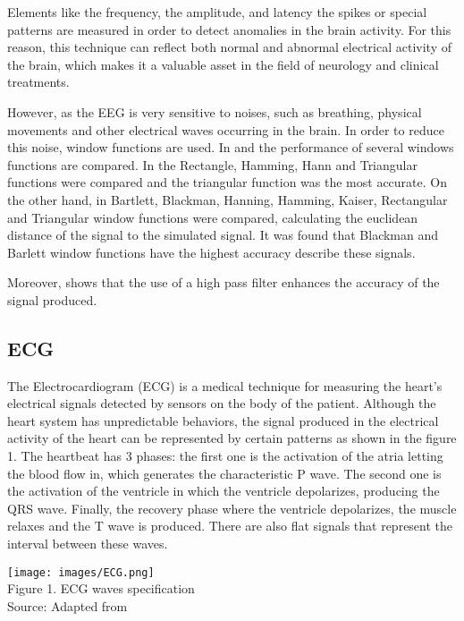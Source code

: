 Elements like the frequency, the amplitude, and latency the spikes or special patterns  are measured  in order to detect anomalies in the brain activity. For this reason, this technique can reflect both normal and abnormal electrical activity of the brain, which makes it a valuable asset in the field of neurology and clinical treatments. 

However, as the EEG is very sensitive to noises, such as breathing, physical movements and other electrical waves occurring in the brain. In order to reduce this noise, window functions are used. In \cite{EEGwindowfunc1} and \cite{EEGwindowfunc3} the performance of several windows functions are compared. In \cite{EEGwindowfunc1} the Rectangle, Hamming, Hann and Triangular functions were compared and the triangular function was the most accurate. On the other hand, in \cite{EEGwindowfunc2} Bartlett, Blackman, Hanning, Hamming, Kaiser, Rectangular and Triangular window functions were compared, calculating the euclidean distance of the signal to the simulated signal. It was found that Blackman and Barlett window functions have the highest accuracy describe these signals.

Moreover, \cite{EEGwindowfunc1} shows that the use of a high pass filter enhances the accuracy of the signal produced.

\subsection{ECG}
The Electrocardiogram (ECG) is a medical technique for measuring the heart's electrical signals detected by sensors on the body of the patient. Although the heart system has unpredictable behaviors, the signal produced in the electrical activity of the heart can be represented by certain patterns  as shown in the figure 1. The heartbeat has 3 phases: the first one is the activation of the atria letting the blood flow in, which generates the characteristic P wave. The second one is the activation of the ventricle in which the ventricle depolarizes, producing the QRS wave. Finally, the recovery phase where the ventricle depolarizes, the muscle relaxes  and the T wave is produced. There are also flat signals that represent the interval between these waves. 

\begin{center}
\texttt{[image: images/ECG.png]}
\\Figure 1. ECG waves specification
\\Source: Adapted from \cite{ECGEventB}
\end{center}


